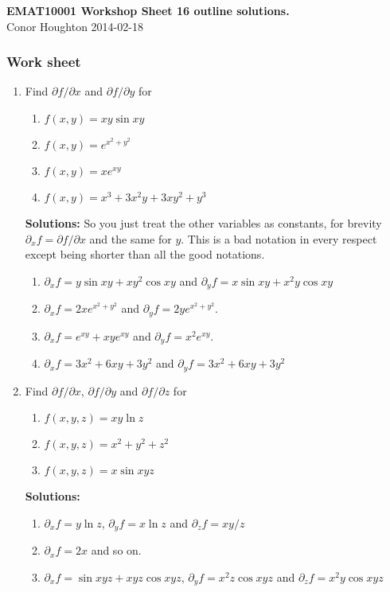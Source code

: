 \documentclass[12pt]{article}
\begin{document}
\begin{center}
{\bf EMAT10001 Workshop Sheet 16 outline solutions.}\\[1cm]{} Conor Houghton 2014-02-18
\end{center}

\subsubsection*{Work sheet}

\begin{enumerate}


\item Find $\partial f/\partial x$ and $\partial f/\partial y$ for 
\begin{enumerate}
\item $f(x,y)=xy\sin{xy}$
\item $f(x,y)=e^{x^2+y^2}$
\item $f(x,y)=xe^{xy}$
\item $f(x,y)=x^3+3x^2y+3xy^2+y^3$
\end{enumerate}

\textbf{Solutions: } So you just treat the other variables as
constants, for brevity $\partial_xf=\partial f/\partial x$ and the
same for $y$. This is a bad notation in every respect except being
shorter than all the good notations.
\begin{enumerate}
\item $\partial_xf=y\sin{xy}+xy^2\cos{xy}$ and $\partial_yf=x\sin{xy}+x^2y\cos{xy}$ 
\item $\partial_xf=2xe^{x^2+y^2}$ and $\partial_yf=2ye^{x^2+y^2}$.
\item $\partial_xf=e^{xy}+xye^{xy}$ and $\partial_yf=x^2e^{xy}$.
\item $\partial_xf=3x^2+6xy+3y^2$ and $\partial_yf=3x^2+6xy+3y^2$ 
\end{enumerate}
 
\item Find $\partial f/\partial x$, $\partial f/\partial y$ and $\partial f/\partial z$ for 
\begin{enumerate}
\item $f(x,y,z)=xy\ln{z}$
\item $f(x,y,z)=x^2+y^2+z^2$
\item $f(x,y,z)=x\sin{xyz}$
\end{enumerate}

\textbf{Solutions: }
\begin{enumerate}
\item $\partial_xf=y\ln{z}$, $\partial_yf=x\ln{z}$ and $\partial_zf=xy/z$
\item $\partial_xf=2x$ and so on.
\item $\partial_xf=\sin{xyz}+xyz\cos{xyz}$, $\partial_yf=x^2z\cos{xyz}$ and  $\partial_zf=x^2y\cos{xyz}$
\end{enumerate}



\end{enumerate}
\end{document}
